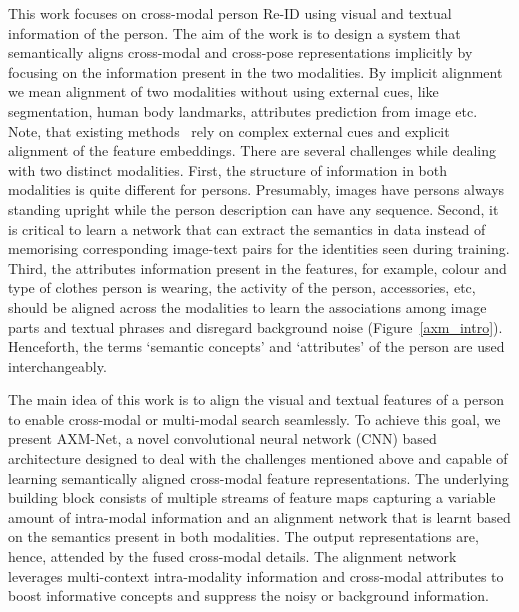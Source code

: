 \documentclass[10pt,twocolumn,letterpaper]{article}
\begin{document}
 This work focuses on cross-modal person Re-ID using visual and textual information of the person. The aim of the work is to design a system that semantically aligns cross-modal and cross-pose representations implicitly by focusing on the information present in the two modalities. By implicit alignment we mean alignment of two modalities without using external cues, like segmentation, human body landmarks, attributes prediction from image etc. Note, that existing methods~\cite{aggarwal2020text,wang2020vitaa,jing2018pose} rely on complex external cues and explicit alignment of the feature embeddings. 
 There are several challenges while dealing with two distinct modalities. First, the structure of information in both modalities is quite different for persons. Presumably, images have persons always standing upright while the person description can have any sequence. Second, it is critical to learn a network that can extract the semantics in data instead of memorising corresponding image-text pairs for the identities seen during training. Third, the attributes information present in the features, for example, colour and type of clothes person is wearing, the activity of the person, accessories, etc, should be aligned across the modalities to learn the associations among image parts and textual phrases and disregard background noise (Figure~\ref{axm_intro}). Henceforth, the terms `semantic concepts’ and  `attributes’ of the person are used interchangeably.
 
The main idea of this work is to align the visual and textual features of a person to enable cross-modal or multi-modal search seamlessly. To achieve this goal, we present AXM-Net, a novel convolutional neural network (CNN) based architecture designed to deal with the challenges mentioned above and capable of learning semantically aligned cross-modal feature representations. The underlying building block consists of multiple streams of feature maps capturing a variable amount of intra-modal information and an alignment network that is learnt based on the semantics present in both modalities. The output representations are, hence, attended by the fused cross-modal details. The alignment network leverages multi-context intra-modality information and cross-modal attributes to boost informative concepts and suppress the noisy or background information.
 
\end{document}

